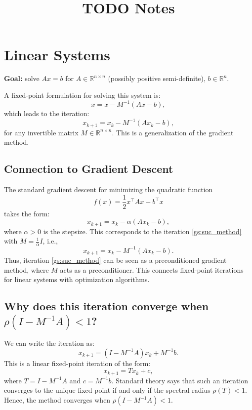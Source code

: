 \documentclass[12pt]{article}
\title{TODO Notes}
\date{}
\begin{document}
\maketitle

\section{Linear Systems}\label{sec:lin}
\textbf{Goal:} solve $Ax = b$ for $A \in \mathbb{R}^{n \times n}$ (possibly positive semi-definite), $b \in \mathbb{R}^n$.

A fixed-point formulation for solving this system is:
\begin{equation}
    \label{gs:fixed}
    x = x - M^{-1}(Ax - b),
\end{equation}
which leads to the iteration:
\begin{equation}
    \label{gs:suc_method}
    x_{k+1} = x_k - M^{-1}(Ax_k - b),
\end{equation}
for any invertible matrix \( M \in \mathbb{R}^{n \times n} \). This is a generalization of the gradient method.

\subsection*{Connection to Gradient Descent}

The standard gradient descent for minimizing the quadratic function
\[
f(x) = \frac{1}{2} x^\top A x - b^\top x
\]
takes the form:
\[
x_{k+1} = x_k - \alpha (Ax_k - b),
\]
where \( \alpha > 0 \) is the stepsize. This corresponds to the iteration \eqref{gs:suc_method} with \( M = \frac{1}{\alpha} I \), i.e.,
\[
x_{k+1} = x_k - M^{-1}(Ax_k - b).
\]
Thus, iteration \eqref{gs:suc_method} can be seen as a preconditioned gradient method, where \( M \) acts as a preconditioner. This connects fixed-point iterations for linear systems with optimization algorithms.

\subsection*{Why does this iteration converge when \( \rho(I - M^{-1}A) < 1 \)?}

We can write the iteration as:
\[
x_{k+1} = (I - M^{-1}A)x_k + M^{-1}b.
\]
This is a linear fixed-point iteration of the form:
\[
x_{k+1} = Tx_k + c,
\]
where \( T = I - M^{-1}A \) and \( c = M^{-1}b \). Standard theory says that such an iteration converges to the unique fixed point if and only if the spectral radius \( \rho(T) < 1 \). Hence, the method converges when \( \rho(I - M^{-1}A) < 1 \).
\end{document}
